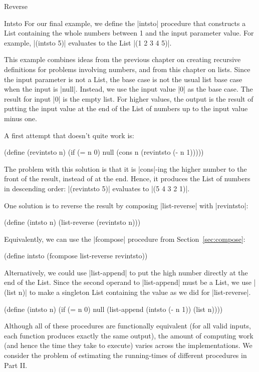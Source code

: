 \begin{schemeregion}
\begin{examplenobar}{Reverse}
\end{examplenobar}

\begin{examplenobar}{Intsto}\label{example:intsto} For our final example, we define the \scheme|intsto| procedure that constructs a List containing the whole numbers between 1 and the input parameter value.  For example, \scheme|(intsto 5)| evaluates to the List \schemeresult|(1 2 3 4 5)|.  

This example combines ideas from the previous chapter on creating recursive definitions for problems involving numbers, and from this chapter on lists.  Since the input parameter is not a List, the base case is not the usual list base case when the input is \scheme|null|.  Instead, we use the input value \scheme|0| as the base case.  The result for input \scheme|0| is the empty list.  For higher values, the output is the result of putting the input value at the end of the List of numbers up to the input value minus one.

A first attempt that doesn't quite work is:
\begin{schemedisplay}
(define (revintsto n)
  (if (= n 0) null 
      (cons n (revintsto (- n 1)))))
\end{schemedisplay}
The problem with this solution is that it is \scheme|cons|-ing the higher number to the front of the result, instead of at the end.  Hence, it produces the List of numbers in descending order: \scheme|(revintsto 5)| evaluates to \schemeresult|(5 4 3 2 1)|.

One solution is to reverse the result by composing \scheme|list-reverse| with \scheme|revintsto|:
\begin{schemedisplay}
(define (intsto n) (list-reverse (revintsto n)))
\end{schemedisplay}
Equivalently, we can use the \scheme|fcompose| procedure from Section~\ref{sec:compose}:
\begin{schemedisplay}
(define intsto (fcompose list-reverse revintsto))
\end{schemedisplay}

Alternatively, we could use \scheme|list-append| to put the high number directly at the end of the List.  Since the second operand to \scheme|list-append| must be a List, we use \scheme|(list n)| to make a singleton List containing the value as we did for \scheme|list-reverse|.  
\begin{schemedisplay}
(define (intsto n)
  (if (= n 0) null 
      (list-append (intsto (- n 1)) (list n))))
\end{schemedisplay}
Although all of these procedures are functionally equivalent (for all valid inputs, each function produces exactly the same output), the amount of computing work (and hence the time they take to execute) varies across the implementations.  We consider the problem of estimating the running-times of different procedures in Part II.


\end{examplenobar}
\end{schemeregion}
